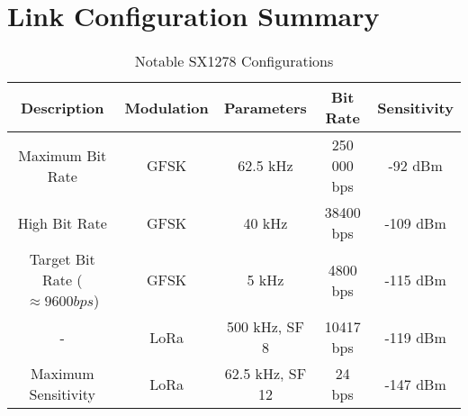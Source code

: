 \section{Link Configuration Summary}
\begin{table}[!htb]
    \centering
    \renewcommand{\arraystretch}{1.2}
    \begin{tabular}{ |c|c|c|c|c| }
    \hline
    \textbf{Description} & \textbf{Modulation} & \textbf{Parameters} & \textbf{Bit Rate} & \textbf{Sensitivity} \\
    \hline
    Maximum Bit Rate &
    GFSK &
    62.5 kHz &
    250 000 bps &
    -92 dBm \\
    \hline
    High Bit Rate &
    GFSK &
    40 kHz &
    38400 bps &
    -109 dBm \\
    \hline
    Target Bit Rate ($\approx 9600 bps$) &
    GFSK &
    5 kHz &
    4800 bps &
    -115 dBm \\
    \hline
    - &
    LoRa &
    500 kHz, SF 8 &
    10417 bps &
    -119 dBm \\
    \hline
    Maximum Sensitivity &
    LoRa &
    62.5 kHz, SF 12 &
    24 bps &
    -147 dBm \\
    \hline
    \end{tabular}
    \caption{Notable SX1278 Configurations \cite{datasheet-SX1278}}
    \label{tab:sensitivity_values}
  \end{table}